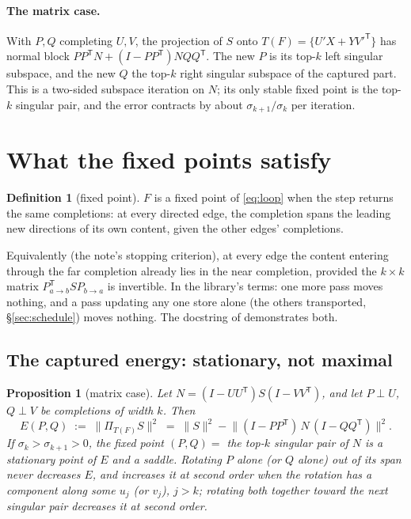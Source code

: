 \documentclass[11pt]{article}
\newcommand{\T}{\mathsf{T}}
\theoremstyle{definition}
\newtheorem{definition}{Definition}
\theoremstyle{plain}
\newtheorem{proposition}{Proposition}
\begin{document}
\paragraph{The matrix case.} With $P,Q$ completing $U,V$, the projection of $S$ onto $T(F)=\{U'X+YV'^\T\}$ has normal
block $PP^\T N+(I-PP^\T)NQQ^\T$. The new $P$ is its top-$k$ left singular subspace, and the new $Q$ the top-$k$ right
singular subspace of the captured part. This is a two-sided subspace iteration on $N$; its only stable fixed point is
the top-$k$ singular pair, and the error contracts by about $\sigma_{k+1}/\sigma_k$ per iteration.

\section{What the fixed points satisfy}\label{sec:fixed}

\begin{definition}[fixed point]
$F$ is a fixed point of \eqref{eq:loop} when the step returns the same completions: at every directed edge, the
completion spans the leading new directions of its own content, given the other edges' completions.
\end{definition}

Equivalently (the note's stopping criterion), at every edge the content entering through the far completion already
lies in the near completion, provided the $k\times k$ matrix $P_{a\to b}^\T S P_{b\to a}$ is invertible. In the
library's terms: one more pass moves nothing, and a pass updating any one store alone (the others transported,
\S\ref{sec:schedule}) moves nothing. The docstring of  demonstrates both.

\subsection{The captured energy: stationary, not maximal}

\begin{proposition}[matrix case]\label{prop:matrix}
Let $N=(I-UU^\T)S(I-VV^\T)$, and let $P\perp U$, $Q\perp V$ be completions of width $k$. Then
\begin{equation}\label{eq:energy}
  E(P,Q)\;:=\;\|\Pi_{T(F)}S\|^2 \;=\; \|S\|^2-\bigl\|(I-PP^\T)\,N\,(I-QQ^\T)\bigr\|^2 .
\end{equation}
If $\sigma_k>\sigma_{k+1}>0$, the fixed point $(P,Q)=$ the top-$k$ singular pair of $N$ is a stationary point of $E$
and a saddle. Rotating $P$ alone (or $Q$ alone) out of its span never decreases $E$, and increases it at second order
when the rotation has a component along some $u_j$ (or $v_j$), $j>k$; rotating both together toward the next singular
pair decreases it at second order.
\end{proposition}
\end{document}
